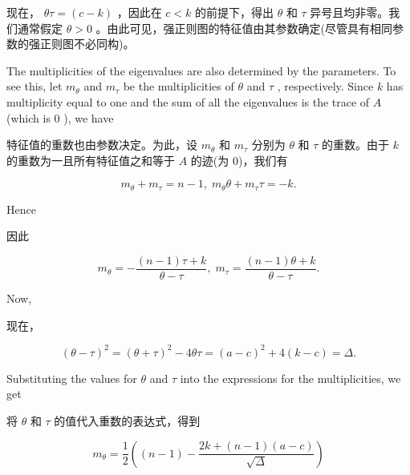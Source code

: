 \documentclass[10pt]{article}
\begin{document}
\begin{tcolorbox}\relax
现在， \({\theta \tau } = \left( {c - k}\right)\) ，因此在 \(c < k\) 的前提下，得出 \(\theta\) 和 \(\tau\) 异号且均非零。我们通常假定 \(\theta  > 0\) 。由此可见，强正则图的特征值由其参数确定(尽管具有相同参数的强正则图不必同构)。
\end{tcolorbox}

The multiplicities of the eigenvalues are also determined by the parameters. To see this, let \({m}_{\theta }\) and \({m}_{\tau }\) be the multiplicities of \(\theta\) and \(\tau\) , respectively. Since \(k\) has multiplicity equal to one and the sum of all the eigenvalues is the trace of \(A\) (which is 0 ), we have

\begin{tcolorbox}\relax
特征值的重数也由参数决定。为此，设 \({m}_{\theta }\) 和 \({m}_{\tau }\) 分别为 \(\theta\) 和 \(\tau\) 的重数。由于 \(k\) 的重数为一且所有特征值之和等于 \(A\) 的迹(为 0)，我们有
\end{tcolorbox}

\[
{m}_{\theta } + {m}_{\tau } = n - 1,\;{m}_{\theta }\theta  + {m}_{\tau }\tau  =  - k.
\]

Hence

\begin{tcolorbox}\relax
因此
\end{tcolorbox}

\[
{m}_{\theta } =  - \frac{\left( {n - 1}\right) \tau  + k}{\theta  - \tau },\;{m}_{\tau } = \frac{\left( {n - 1}\right) \theta  + k}{\theta  - \tau }. \tag{10.2}
\]

Now,

\begin{tcolorbox}\relax
现在，
\end{tcolorbox}

\[
{\left( \theta  - \tau \right) }^{2} = {\left( \theta  + \tau \right) }^{2} - {4\theta \tau } = {\left( a - c\right) }^{2} + 4\left( {k - c}\right)  = \Delta .
\]

Substituting the values for \(\theta\) and \(\tau\) into the expressions for the multiplicities, we get

\begin{tcolorbox}\relax
将 \(\theta\) 和 \(\tau\) 的值代入重数的表达式，得到
\end{tcolorbox}

\[
{m}_{\theta } = \frac{1}{2}\left( {\left( {n - 1}\right)  - \frac{{2k} + \left( {n - 1}\right) \left( {a - c}\right) }{\sqrt{\Delta }}}\right)
\]
\end{document}
